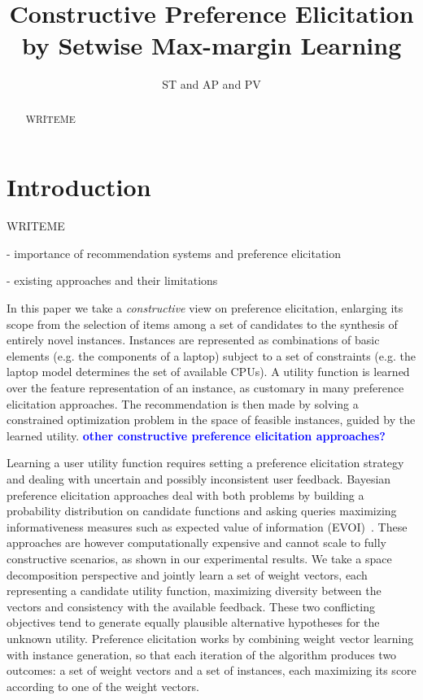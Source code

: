 \documentclass{article}
\title{Constructive Preference Elicitation by Setwise Max-margin Learning}
\author{ST and AP and PV}
\renewcommand\[{\begin{equation}}
\renewcommand\]{\end{equation}}
\newcommand{\andrea}[1]{{\bf \textcolor{blue}{{\fbox{Andrea:} #1}}}}
\begin{document}
\maketitle

\begin{abstract}
WRITEME
\end{abstract}

\section{Introduction}

WRITEME

- importance of recommendation systems and preference elicitation

- existing approaches and their limitations

In this paper we take a {\em constructive} view on preference
elicitation, enlarging its scope from the selection of items among a
set of candidates to the synthesis of entirely novel
instances. Instances are represented as combinations of basic elements
(e.g. the components of a laptop) subject to a set of constraints
(e.g. the laptop model determines the set of available CPUs). A
utility function is learned over the feature representation of an
instance, as customary in many preference elicitation approaches. The
recommendation is then made by solving a constrained optimization
problem in the space of feasible instances, guided by the learned
utility. \andrea{other constructive preference elicitation approaches?}

Learning a user utility function requires setting a preference
elicitation strategy and dealing with uncertain and possibly
inconsistent user feedback. Bayesian preference elicitation approaches
deal with both problems by building a probability distribution on
candidate functions and asking queries maximizing informativeness
measures such as expected value of information (EVOI)~\cite{}. These
approaches are however computationally expensive and cannot scale to
fully constructive scenarios, as shown in our experimental results.
We take a space decomposition perspective and jointly learn a set of
weight vectors, each representing a candidate utility function,
maximizing diversity between the vectors and consistency with the
available feedback. These two conflicting objectives tend to generate
equally plausible alternative hypotheses for the unknown
utility. Preference elicitation works by combining weight vector
learning with instance generation, so that each iteration of the
algorithm produces two outcomes: a set of weight vectors and a set of
instances, each maximizing its score according to one of the weight
vectors. 
\end{document}
